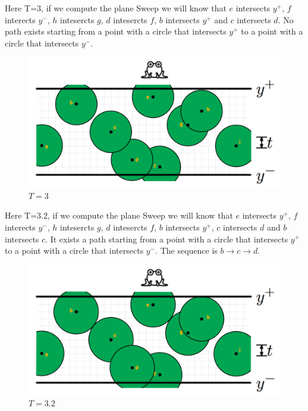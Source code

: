 \documentclass[12pt]{article}
\begin{document}
\noindent Here T=3, if we compute the plane Sweep we will know that $e$ intersects $y^+$, $f$ interects $y^-$, $h$ intesercts $g$, $d$ intesercts $f$, $b$ intersects $y^+$ and $c$ intersects $d$. No path exists starting from a point with a circle that intersects $y^+$ to a point with a circle that intersects $y^-$.
\begin{figure}[H]
	\centering
	\includegraphics[scale=0.3]{img/problem2-T3.png}
	\caption{$T=3$} \label{fig:1f}
\end{figure}

\noindent Here T=3.2, if we compute the plane Sweep we will know that $e$ intersects $y^+$, $f$ interects $y^-$, $h$ intesercts $g$, $d$ intesercts $f$, $b$ intersects $y^+$, $c$ intersects $d$ and $b$ intersects $c$. It exists a path starting from a point with a circle that intersects $y^+$ to a point with a circle that intersects $y^-$. The sequence is $b \rightarrow c \rightarrow d$.
\begin{figure}[H]
	\centering
	\includegraphics[scale=0.3]{img/problem2-T3_2.png}
	\caption{$T=3.2$} \label{fig:1g}
\end{figure}
\end{document}
